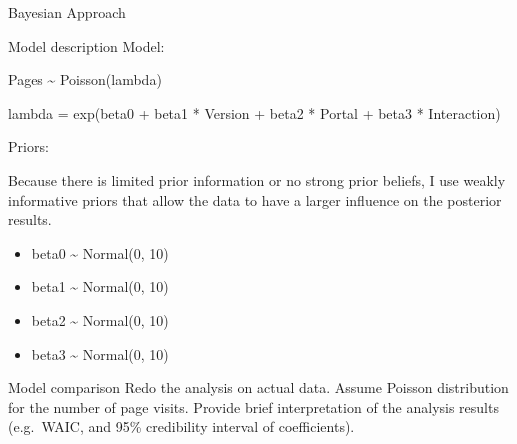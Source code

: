 \documentclass[
  ignorenonframetext,
]{beamer}
\newenvironment{Shaded}{\begin{snugshade}}{\end{snugshade}}
\newcommand{\CommentTok}[1]{\textcolor[rgb]{0.56,0.35,0.01}{\textit{#1}}}
\newcommand{\FunctionTok}[1]{\textcolor[rgb]{0.00,0.00,0.00}{#1}}
\newcommand{\NormalTok}[1]{#1}
\newcommand{\OtherTok}[1]{\textcolor[rgb]{0.56,0.35,0.01}{#1}}
\newcommand{\SpecialCharTok}[1]{\textcolor[rgb]{0.00,0.00,0.00}{#1}}
\newcommand{\StringTok}[1]{\textcolor[rgb]{0.31,0.60,0.02}{#1}}
\providecommand{\tightlist}{%
  \setlength{\itemsep}{0pt}\setlength{\parskip}{0pt}}
\begin{document}
\begin{frame}[fragile]{Bayesian Approach}
\begin{block}{Model description}
Model:

Pages \textasciitilde{} Poisson(lambda)

lambda = exp(beta0 + beta1 * Version + beta2 * Portal + beta3 *
Interaction)

Priors:

Because there is limited prior information or no strong prior beliefs, I
use weakly informative priors that allow the data to have a larger
influence on the posterior results.

\begin{itemize}
\tightlist
\item
  beta0 \textasciitilde{} Normal(0, 10)
\item
  beta1 \textasciitilde{} Normal(0, 10)
\item
  beta2 \textasciitilde{} Normal(0, 10)
\item
  beta3 \textasciitilde{} Normal(0, 10)
\end{itemize}
\end{block}

\begin{block}{Model comparison}
\protect\hypertarget{model-comparison-1}{}
Redo the analysis on actual data. Assume Poisson distribution for the
number of page visits. Provide brief interpretation of the analysis
results (e.g.~WAIC, and 95\% credibility interval of coefficients).

\begin{Shaded}
\end{Shaded}
\end{block}
\end{frame}
\end{document}
